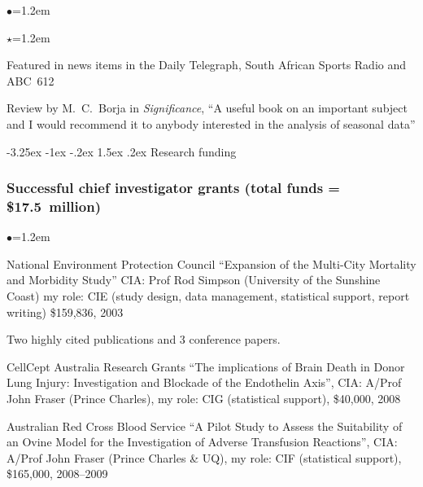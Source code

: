 \documentclass[a4paper,11pt]{article}
\makeatletter
\renewcommand\subsection{\@startsection{subsection}{2}{\z@}%
                                       {-3.25ex \@plus -1ex \@minus -.2ex}%
                                       {1.5ex \@plus .2ex}%
                                   {\normalfont\normalsize\bfseries\color{blue}}}
\renewcommand{\labelitemi}{$\bullet$}
\renewcommand{\labelitemii}{$\star$}
\makeatother
\begin{document}
\begin{raggedright}
\begin{list}{\labelitemi}{\leftmargin=1.2em}
\begin{list}{\labelitemii}{\leftmargin=1.2em}
\item Featured in news items in the Daily Telegraph, South African Sports Radio and ABC~612
\item Review by M.\ C.\ Borja in \textit{Significance}, ``A useful book on an important subject and I would recommend it to anybody interested in the analysis of seasonal data''
\end{list}
\end{list}

\subsection{Research funding}

\subsubsection*{Successful chief investigator grants (total funds = \$17.5~million)} %

\begin{list}{\labelitemi}{\leftmargin=1.2em}\addtolength{\itemsep}{-0.5\baselineskip}

\item National Environment Protection Council ``Expansion of the Multi-City Mortality and Morbidity Study'' CIA: Prof Rod Simpson (University of the Sunshine Coast) my role: CIE (study design, data management, statistical support, report writing) \$159,836, 2003

    Two highly cited publications  and 3 conference papers.%

\item CellCept Australia Research Grants ``The implications of Brain Death in Donor Lung Injury: Investigation and Blockade of the Endothelin Axis'', CIA: A/Prof John Fraser (Prince Charles), my role: CIG (statistical support), \$40,000, 2008

\item Australian Red Cross Blood Service ``A Pilot Study to Assess the Suitability of an Ovine Model for the Investigation of Adverse Transfusion Reactions'', CIA: A/Prof John Fraser (Prince Charles \& UQ), my role: CIF (statistical support), \$165,000, 2008--2009


\end{list}
\end{raggedright}
\end{document}
